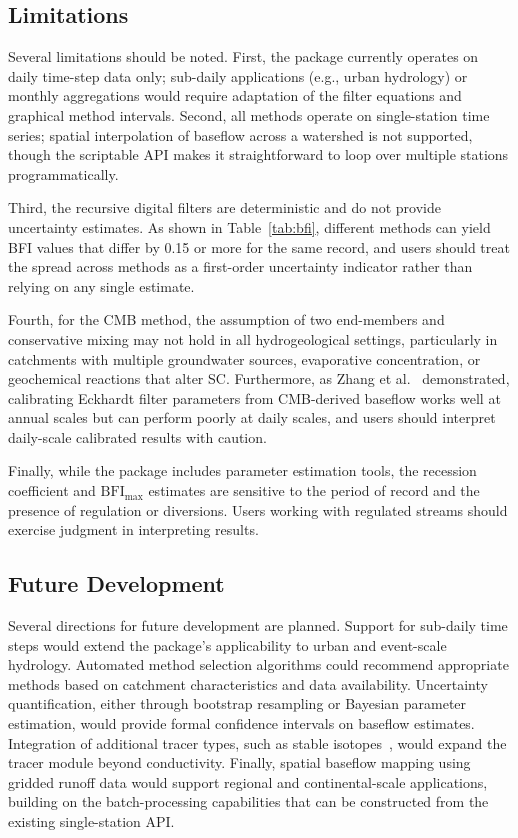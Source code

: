 \documentclass[hydrology,article,submit,pdftex,moreauthors]{Definitions/mdpi}
\begin{document}
\subsection{Limitations}
\label{sec:limitations}

Several limitations should be noted. First, the package currently operates on daily time-step data only; sub-daily applications (e.g., urban hydrology) or monthly aggregations would require adaptation of the filter equations and graphical method intervals. Second, all methods operate on single-station time series; spatial interpolation of baseflow across a watershed is not supported, though the scriptable API makes it straightforward to loop over multiple stations programmatically.

Third, the recursive digital filters are deterministic and do not provide uncertainty estimates. As shown in Table~\ref{tab:bfi}, different methods can yield BFI values that differ by 0.15 or more for the same record, and users should treat the spread across methods as a first-order uncertainty indicator rather than relying on any single estimate.

Fourth, for the CMB method, the assumption of two end-members and conservative mixing may not hold in all hydrogeological settings, particularly in catchments with multiple groundwater sources, evaporative concentration, or geochemical reactions that alter SC. Furthermore, as Zhang et al.~\cite{Zhang2021} demonstrated, calibrating Eckhardt filter parameters from CMB-derived baseflow works well at annual scales but can perform poorly at daily scales, and users should interpret daily-scale calibrated results with caution.

Finally, while the package includes parameter estimation tools, the recession coefficient and $\mathrm{BFI_{max}}$ estimates are sensitive to the period of record and the presence of regulation or diversions. Users working with regulated streams should exercise judgment in interpreting results.

\subsection{Future Development}
\label{sec:future}

Several directions for future development are planned. Support for sub-daily time steps would extend the package's applicability to urban and event-scale hydrology. Automated method selection algorithms could recommend appropriate methods based on catchment characteristics and data availability. Uncertainty quantification, either through bootstrap resampling or Bayesian parameter estimation, would provide formal confidence intervals on baseflow estimates. Integration of additional tracer types, such as stable isotopes~\cite{Klaus2013}, would expand the tracer module beyond conductivity. Finally, spatial baseflow mapping using gridded runoff data would support regional and continental-scale applications, building on the batch-processing capabilities that can be constructed from the existing single-station API.
\end{document}
